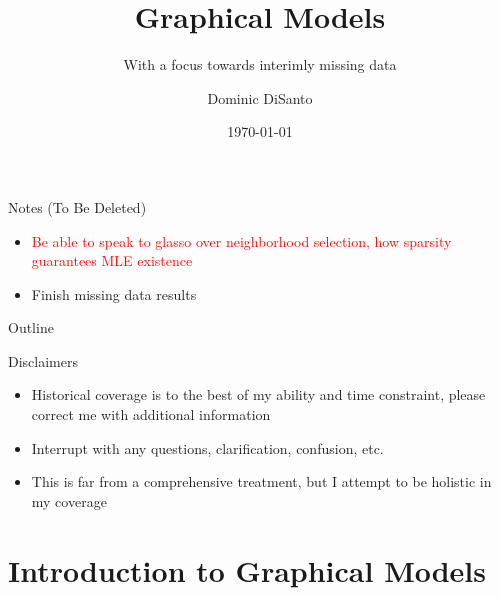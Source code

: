 \documentclass{beamer}
\title{Graphical Models}
\subtitle{With a focus towards interimly missing data}
\author{Dominic DiSanto}
\institute[]{Department of Biostatistics, Harvard University}
\date{\today}
\begin{document}
\begin{frame}{Notes (To Be Deleted)}
    \begin{itemize}
        \item \textcolor{red}{Be able to speak to glasso over neighborhood selection, how sparsity guarantees MLE existence}
        \item Finish missing data results 
    \end{itemize}
\end{frame}


\maketitle


\begin{frame}{Outline}
\tableofcontents 
\end{frame}

\begin{frame}{Disclaimers}
    \begin{itemize}\setlength\itemsep{8mm}
        \item Historical coverage is to the best of my ability and time constraint, please correct me with additional information
        \item Interrupt with any questions, clarification, confusion, etc. 
        \item This is far from a comprehensive treatment, but I attempt to be holistic in my coverage 
    \end{itemize}
\end{frame}

\section{Introduction to Graphical Models}
\end{document}
